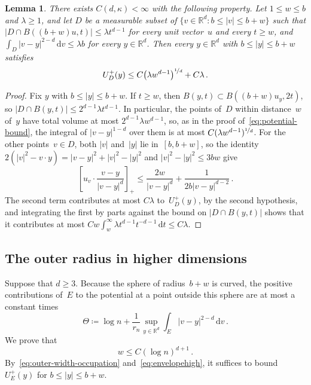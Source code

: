 \documentclass[11pt]{amsart}
\theoremstyle{plain}
\newtheorem{lemma}[theorem]{Lemma}
\theoremstyle{definition}
\newcommand{\R}{\mathbb R}
\newcommand{\drift}{\kappa}
\newcommand{\dd}{\,\mathrm d}
\newcommand{\nf}{\nicefrac}
\numberwithin{equation}{section}
\begin{document}
\begin{lemma}\label{lem:near-far}
There exists $C(d,\drift)<\infty$ with the following property. Let $1\leq w\leq b$ and $\lambda\geq1$, and let $D$ be a measurable subset of $\{v\in\R^d:b\leq|v|\leq b+w\}$ such that $|D\cap B((b+w)u,t)|\leq\lambda t^{d-1}$ for every unit vector~$u$ and every $t\geq w$, and $\int_D|v-y|^{2-d}\dd v\leq\lambda b$ for every $y\in\R^d$. Then every $y\in\R^d$ with $b\leq|y|\leq b+w$ satisfies
\begin{equation*}
U_D^+(y)\leq C\bigl(\lambda w^{d-1}\bigr)^{\nf1d}+C\lambda\, .
\end{equation*}
\end{lemma}

\begin{proof}
Fix $y$ with $b\leq|y|\leq b+w$. If $t\geq w$, then $B(y,t)\subset B((b+w)u_y,2t)$, so $|D\cap B(y,t)|\leq2^{d-1}\lambda t^{d-1}$. In particular, the points of~$D$ within distance~$w$ of~$y$ have total volume at most $2^{d-1}\lambda w^{d-1}$, so, as in the proof of~\eqref{eq:potential-bound}, the integral of $|v-y|^{1-d}$ over them is at most $C(\lambda w^{d-1})^{\nf1d}$. For the other points~$v\in D$, both $|v|$ and~$|y|$ lie in~$[b,b+w]$, so the identity $2(|v|^2-v\cdot y)=|v-y|^2+|v|^2-|y|^2$ and $|v|^2-|y|^2\leq3bw$ give
\begin{equation*}
\left[u_v\cdot\frac{v-y}{|v-y|^d}\right]_+\leq\frac{2w}{|v-y|^d}+\frac1{2b|v-y|^{d-2}}\, .
\end{equation*}
The second term contributes at most $C\lambda$ to~$U_D^+(y)$, by the second hypothesis, and integrating the first by parts against the bound on $|D\cap B(y,t)|$ shows that it contributes at most $Cw\int_w^\infty\lambda t^{d-1}t^{-d-1}\dd t\leq C\lambda$.
\end{proof}

\subsection{The outer radius in higher dimensions}\label{sec:outer-high}

Suppose that $d\geq3$. Because the sphere of radius~$b+w$ is curved, the positive contributions of~$E$ to the potential at a point outside this sphere are at most a constant times
\begin{equation}\label{eq:curvature-size}
\Theta\coloneqq\log n+\frac1{r_n}\sup_{y\in\R^d}\int_E|v-y|^{2-d}\dd v\, .
\end{equation}
We prove that
\begin{equation}\label{eq:outer-polylog}
w\leq C(\log n)^{d+1}\, .
\end{equation}
By~\eqref{eq:outer-width-occupation} and~\eqref{eq:envelopehigh}, it suffices to bound $U_E^+(y)$ for $b\leq|y|\leq b+w$.
\end{document}
